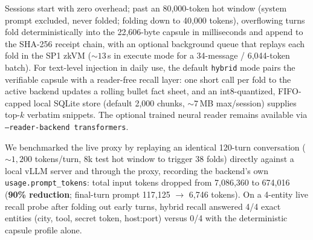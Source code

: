 \documentclass[11pt]{article}
\begin{document}
Sessions start with zero overhead; past an 80{,}000-token hot window
(system prompt excluded, never folded; folding down to 40{,}000 tokens),
overflowing turns fold deterministically into the 22{,}606-byte capsule
in milliseconds and append to the SHA-256 receipt chain, with an optional
background queue that replays each fold in the SP1 zkVM (${\sim}13$\,s in
execute mode for a 34-message / 6{,}044-token batch). For text-level
injection in daily use, the default \texttt{hybrid} mode pairs the
verifiable capsule with a reader-free recall layer: one short call per
fold to the active backend updates a rolling bullet fact sheet, and an
int8-quantized, FIFO-capped local SQLite store (default 2{,}000 chunks,
${\sim}7$\,MB max/session) supplies top-$k$ verbatim snippets. The
optional trained neural reader remains available via
\texttt{--reader-backend transformers}.

We benchmarked the live proxy by replaying an identical 120-turn
conversation (${\sim}1{,}200$ tokens/turn, 8k test hot window to trigger
38 folds) directly against a local vLLM server and through the proxy,
recording the backend's own \texttt{usage.prompt\_tokens}: total input
tokens dropped from 7{,}086{,}360 to 674{,}016 (\textbf{90\% reduction};
final-turn prompt 117{,}125 $\to$ 6{,}746 tokens). On a 4-entity live
recall probe after folding out early turns, hybrid recall answered 4/4
exact entities (city, tool, secret token, host:port) versus 0/4 with the
deterministic capsule profile alone.
\end{document}
